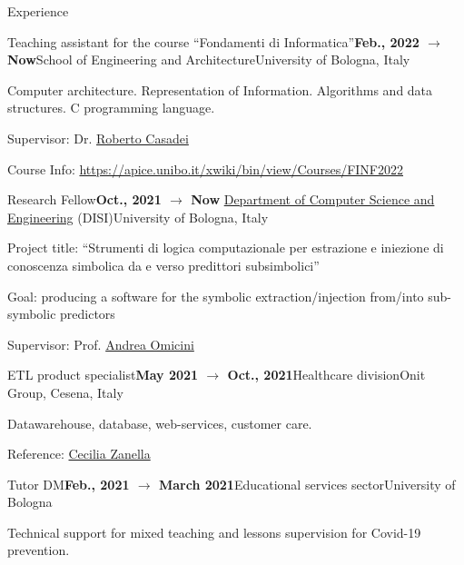 \documentclass{resume} %
\begin{document}
    \begin{rSection}{Experience}
        
        \begin{rSubsection}{Teaching assistant for the course ``Fondamenti di Informatica''}{\textbf{Feb., 2022 $\rightarrow$ Now}}{School of Engineering and Architecture}{University of Bologna, Italy}
            \item Computer architecture. Representation of Information. Algorithms and data structures. C programming language.
            \item Supervisor: Dr. \href{mailto:roberto.casadei@unibo.it}{Roberto Casadei}
            \item Course Info: \url{https://apice.unibo.it/xwiki/bin/view/Courses/FINF2022}
        \end{rSubsection}
        
        \begin{rSubsection}{Research Fellow}{\textbf{Oct., 2021 $\rightarrow$ Now}}{ \href{https://disi.unibo.it/it}{Department of Computer Science and Engineering} (DISI)}{University of Bologna, Italy}
            \item Project title: ``Strumenti di logica computazionale per estrazione e iniezione di conoscenza simbolica da e verso predittori subsimbolici''
            \item Goal: producing a software for the symbolic extraction/injection from/into sub-symbolic predictors
            \item Supervisor: Prof. \href{mailto:andrea.omicini@unibo.it}{Andrea Omicini}
        \end{rSubsection}
        
        \begin{rSubsection}{ETL product specialist}{\textbf{May 2021 $\rightarrow$ Oct., 2021}}{Healthcare division}{Onit Group, Cesena, Italy}
            \item Datawarehouse, database, web-services, customer care.
            \item Reference: \href{mailto:czanella@onit.it}{Cecilia Zanella}
        \end{rSubsection}
        
        \begin{rSubsection}{Tutor DM}{\textbf{Feb., 2021 $\rightarrow$ March 2021}}{Educational services sector}{University of Bologna}
            \item Technical support for mixed teaching and lessons supervision for Covid-19 prevention.
        \end{rSubsection}
        

\end{rSection}
\end{document}
